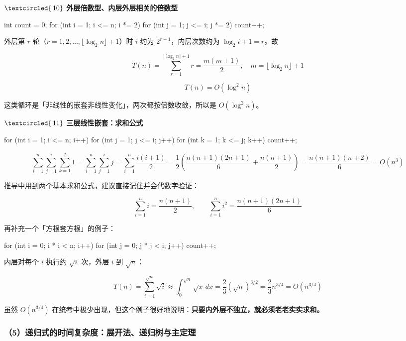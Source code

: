 \documentclass[11pt,openany,UTF8]{ctexbook}
\newcommand{\circled}[1]{\textcircled{\scriptsize\,#1}}
\begin{document}
\textbf{$\circled{10}$ 外层倍数型、内层外层相关的倍数型}

\begin{codebox}
int count = 0;
for (int i = 1; i <= n; i *= 2)
    for (int j = 1; j <= i; j *= 2)
        count++;
\end{codebox}

外层第 $r$ 轮（$r=1,2,\dots,\lfloor\log_2 n\rfloor+1$）时 $i$ 约为 $2^{r-1}$，内层次数约为 $\log_2 i + 1 = r$。故

\[T(n)=\sum_{r=1}^{\lfloor\log_2 n\rfloor+1} r = \frac{m(m+1)}{2},\quad m=\lfloor\log_2 n\rfloor+1\]

\[T(n)=O(\log^2 n)\]

这类循环是「非线性的嵌套非线性变化」，两次都按倍数收敛，所以是 $O(\log^2 n)$。

\textbf{$\circled{11}$ 三层线性嵌套：求和公式}

\begin{codebox}
for (int i = 1; i <= n; i++)
    for (int j = 1; j <= i; j++)
        for (int k = 1; k <= j; k++)
            count++;
\end{codebox}

\[\sum_{i=1}^{n}\sum_{j=1}^{i}\sum_{k=1}^{j}1=\sum_{i=1}^{n}\sum_{j=1}^{i} j=\sum_{i=1}^{n}\frac{i(i+1)}{2}=\frac{1}{2}\left(\frac{n(n+1)(2n+1)}{6}+\frac{n(n+1)}{2}\right)=\frac{n(n+1)(n+2)}{6}=O(n^3)\]

推导中用到两个基本求和公式，建议直接记住并会代数字验证：

\[\sum_{i=1}^{n} i = \frac{n(n+1)}{2},\qquad \sum_{i=1}^{n} i^2 = \frac{n(n+1)(2n+1)}{6}\]

再补充一个「方根套方根」的例子：

\begin{codebox}
for (int i = 0; i * i < n; i++)
    for (int j = 0; j * j < i; j++)
        count++;
\end{codebox}

内层对每个 $i$ 执行约 $\sqrt{i}$ 次，外层 $i$ 到 $\sqrt{n}$：

\[T(n)=\sum_{i=1}^{\sqrt{n}}\sqrt{i}\approx \int_0^{\sqrt n}\sqrt x\,dx=\frac{2}{3}(\sqrt n)^{3/2}=\frac{2}{3}n^{3/4}=O(n^{3/4})\]

虽然 $O(n^{3/4})$ 在统考中极少出现，但这个例子很好地说明：\textbf{只要内外层不独立，就必须老老实实求和。}

\subsubsection{（5）递归式的时间复杂度：展开法、递归树与主定理}
\end{document}

